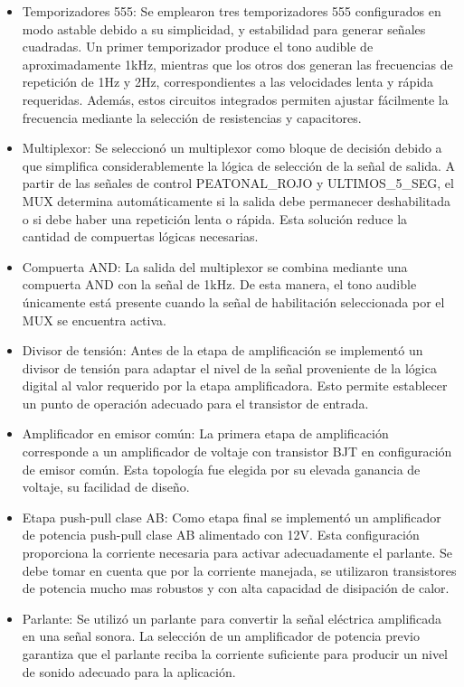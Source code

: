 \documentclass[12pt, journal, onecolumn]{IEEEtran}
\begin{document}
\begin{itemize}

    \item Temporizadores 555: Se emplearon tres temporizadores 555 configurados en modo astable debido a su simplicidad, y estabilidad para generar señales cuadradas. Un primer temporizador produce el tono audible de aproximadamente 1kHz, mientras que los otros dos generan las frecuencias de repetición de 1Hz y 2Hz, correspondientes a las velocidades lenta y rápida requeridas. Además, estos circuitos integrados permiten ajustar fácilmente la frecuencia mediante la selección de resistencias y capacitores.

    \item Multiplexor: Se seleccionó un multiplexor como bloque de decisión debido a que simplifica considerablemente la lógica de selección de la señal de salida. A partir de las señales de control PEATONAL\_ROJO y ULTIMOS\_5\_SEG, el MUX determina automáticamente si la salida debe permanecer deshabilitada o si debe haber una repetición lenta o rápida. Esta solución reduce la cantidad de compuertas lógicas necesarias.

    \item Compuerta AND: La salida del multiplexor se combina mediante una compuerta AND con la señal de 1kHz. De esta manera, el tono audible únicamente está presente cuando la señal de habilitación seleccionada por el MUX se encuentra activa.

    \item Divisor de tensión: Antes de la etapa de amplificación se implementó un divisor de tensión para adaptar el nivel de la señal proveniente de la lógica digital al valor requerido por la etapa amplificadora. Esto permite establecer un punto de operación adecuado para el transistor de entrada.

    \item Amplificador en emisor común: La primera etapa de amplificación corresponde a un amplificador de voltaje con transistor BJT en configuración de emisor común. Esta topología fue elegida por su elevada ganancia de voltaje, su facilidad de diseño.

    \item Etapa push-pull clase AB: Como etapa final se implementó un amplificador de potencia push-pull clase AB alimentado con 12V. Esta configuración proporciona la corriente necesaria para activar adecuadamente el parlante. Se debe tomar en cuenta que por la corriente manejada, se utilizaron transistores de potencia mucho mas robustos y con alta capacidad de disipación de calor.

    \item Parlante: Se utilizó un parlante para convertir la señal eléctrica amplificada en una señal sonora. La selección de un amplificador de potencia previo garantiza que el parlante reciba la corriente suficiente para producir un nivel de sonido adecuado para la aplicación.

\end{itemize}
\end{document}
